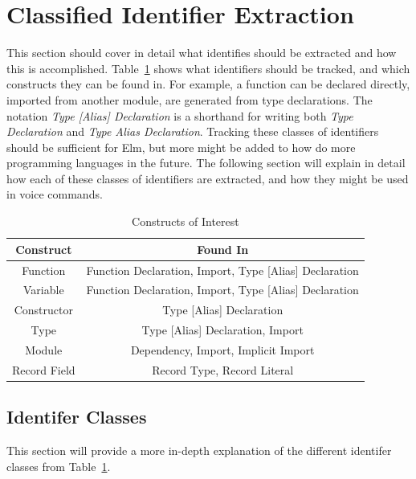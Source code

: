 \documentclass[../thesis.tex]{subfiles}
\begin{document}
\section{Classified Identifier Extraction}%
\label{sec:classified_identifier_extraction}
This section should cover in detail what identifies should be extracted
and how this is accomplished. Table~\ref{tab:constructs_of_interest} shows
what identifiers should be tracked, and which constructs they can be found in.
For example, a function can be declared directly, imported from another module, are generated
from type declarations. The notation \textit{Type [Alias] Declaration} is a shorthand
for writing both \textit{Type Declaration} and \textit{Type Alias Declaration}.
Tracking these classes of identifiers should be sufficient for Elm, but more
might be added to how do more programming languages in the future.
The following section will explain in detail how each of these classes of identifiers
are extracted, and how they might be used in voice commands.

\begin{table}[htpb]
    \label{tab:constructs_of_interest}
    \begin{tabular}{|c|c|}
        \hline
        Construct & Found In \\
        \hline
        Function & Function Declaration, Import, Type [Alias] Declaration \\
        Variable & Function Declaration, Import, Type [Alias] Declaration \\
        Constructor & Type [Alias] Declaration \\
        Type & Type [Alias] Declaration, Import \\
        Module & Dependency, Import, Implicit Import \\
        Record Field & Record Type, Record Literal \\
        \hline
    \end{tabular}
    \caption{Constructs of Interest}
\end{table}

\subsection{Identifer Classes}%
\label{sub:identifer_classes}
This section will provide a more in-depth explanation of the different identifer classes from Table~\ref{tab:constructs_of_interest}. 
\end{document}
